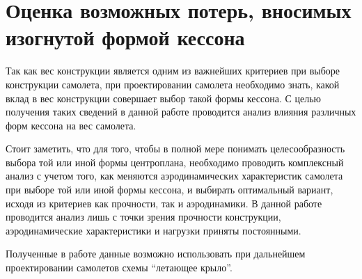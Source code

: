  \section{Оценка возможных потерь, вносимых изогнутой формой кессона}
 
 Так как вес конструкции является одним из важнейших критериев при выборе конструкции самолета, при проектировании самолета необходимо знать, какой вклад в вес конструкции совершает выбор такой формы кессона. С целью получения таких сведений в данной работе проводится анализ влияния различных форм кессона на вес самолета. 

Стоит заметить, что для того, чтобы в полной мере понимать целесообразность выбора той или иной формы центроплана, необходимо проводить комплексный анализ с учетом того, как меняются аэродинамических характеристик самолета при выборе той или иной формы кессона, и выбирать оптимальный вариант, исходя из критериев как прочности, так и аэродинамики. В данной работе проводится анализ лишь с точки зрения прочности конструкции, аэродинамические характеристики и нагрузки приняты постоянными. 

Полученные в работе данные возможно использовать при дальнейшем проектировании самолетов схемы ``летающее крыло''. 